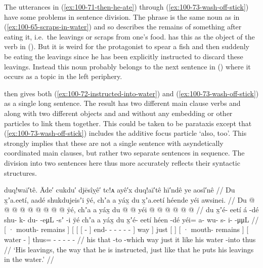 The utterances in (\ref{ex:100-71-then-he-ate}) through (\ref{ex:100-73-wash-off-stick}) have some problems in sentence division.
The phrase  is the same noun as in (\ref{ex:100-65-scraps-in-water}) and so describes the remains of something after eating it, i.e.\ the leavings or scraps from one’s food.
\citeauthor{swanton:1909} has this as the object of the verb in (\lastx).
But it is weird for the protagonist to spear a fish and then suddenly be eating the leavings since he has been explicitly instructed to discard these leavings.
Instead this noun probably belongs to the next sentence in (\nextx) where it occurs as a topic in the left periphery.

\citeauthor{swanton:1909} then gives both (\ref{ex:100-72-instructed-into-water}) and (\ref{ex:100-73-wash-off-stick}) as a single long sentence.
The result has two different main clause verbs  and  along with two different objects  and  and without any embedding or other particles to link them together.
This could be taken to be parataxis except that (\ref{ex:100-73-wash-off-stick}) includes the additive focus particle  ‘also, too’.
This strongly implies that these are not a single sentence with asyndetically coordinated main clauses, but rather two separate sentences in sequence.
The division into two sentences here thus more accurately reflects their syntactic structures.

\ex\label{ex:100-72-instructed-into-water}%
%
\begingl
	\glpreamble	duq!waī′tê. Āde′ cukdu′ djēsîỵê′ tc!ᴀ ayê′x duq!aī′tê hī′ndê ye aosî′nê //
	\glpreamble	Du x̱ʼa.eetí, aadé shukdujeisʼi ÿé, chʼa a yáx̱ du x̱ʼa.eetí héende yéi awsinei. //
	\gla	{} Du  @ {} {}
		{} {} {}  @ {} {}  @ {} @ {} @ {} @ {} @ {} @ {} @ {} ÿé, {}
		chʼa {} a yáx̱ {}
		{} du  @ {} {} 
		{}  @ {} {}
		yéi @  @ {} @ {} @ {} @ {} @ {} //
	\glb	{} du x̱ʼé- eetí {}
		{} {} {} á -dé {} shu- k- du-  -eμL -sʼ -i {} ÿé {}
		chʼa {} a yáx̱ {}
		{} du x̱ʼé- eetí {}
		{} héen -dé {}
		yéi= a- wu- s- i-  -μμL //
	\glc	{}[ · mouth- remains {}]
		{}[ {}[ {}[  - {}]
			end- - -  - - - {}] way {}]
		just {}[   {}]
		{}[ · mouth- remains {}]
		{}[ water - {}]
		thus= - - - -  - //
	\gld	{} his  {} {}
		{} {} {} that -to {}
			 {} {} {} {} {} -which {} way {}
		just {} it like {}
		{} his  {} {} 
		{} water -into {} 
		thus  {} {} {} {} {} //
	\glft	‘His leavings, the way that he is instructed, just like that he puts his leavings in the water.’
		//
\endgl
\xe

